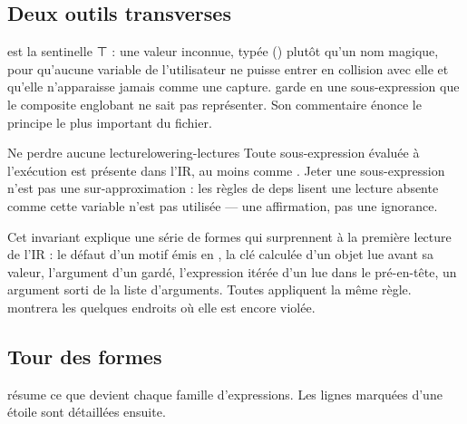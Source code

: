 \subsection{Deux outils transverses}


 est la sentinelle ⊤ : une valeur inconnue, typée () plutôt qu'un nom magique, pour qu'aucune variable de l'utilisateur ne puisse entrer en collision avec elle et qu'elle n'apparaisse jamais comme une capture.  garde en  une sous-expression que le composite englobant ne sait pas représenter. Son commentaire énonce le principe le plus important du fichier.

\begin{invariant}{Ne perdre aucune lecture}{lowering-lectures}
Toute sous-expression évaluée à l'exécution est présente dans l'IR, au moins comme . Jeter une sous-expression n'est pas une sur-approximation : les règles de deps lisent une lecture absente comme \og cette variable n'est pas utilisée\fg{} --- une affirmation, pas une ignorance.
\end{invariant}

Cet invariant explique une série de formes qui surprennent à la première lecture de l'IR : le défaut d'un motif émis en , la clé calculée d'un objet lue avant sa valeur, l'argument d'un  gardé, l'expression itérée d'un  lue dans le pré-en-tête, un argument  sorti de la liste d'arguments. Toutes appliquent la même règle.  montrera les quelques endroits où elle est encore violée.

\subsection{Tour des formes}

 résume ce que devient chaque famille d'expressions. Les lignes marquées d'une étoile sont détaillées ensuite.

